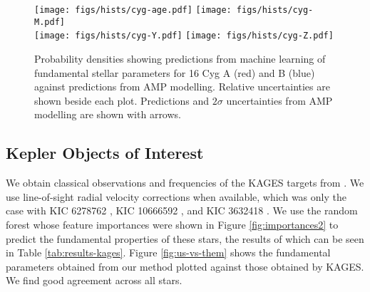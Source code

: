 \documentclass[manuscript]{aastex}
\begin{document}
\begin{figure*}
    \centering
    \texttt{[image: figs/hists/cyg-age.pdf]}\hfill
    \texttt{[image: figs/hists/cyg-M.pdf]}\\
    \texttt{[image: figs/hists/cyg-Y.pdf]}\hfill
    \texttt{[image: figs/hists/cyg-Z.pdf]}
    \caption{Probability densities showing predictions from machine learning of fundamental stellar parameters for 16 Cyg A (red) and B (blue) against predictions from AMP modelling. Relative uncertainties are shown beside each plot. Predictions and $2\sigma$ uncertainties from AMP modelling are shown with arrows.}
    \label{fig:16Cyg-hist}
\end{figure*}


\subsection{Kepler Objects of Interest}
We obtain classical observations and frequencies of the KAGES targets from \citet{2015MNRAS.452.2127S}. We use line-of-sight radial velocity corrections when available, which was only the case with KIC 6278762 \citep{2002AJ....124.1144L}, KIC 10666592 \citep{2013A&A...554A..84M}, and KIC 3632418 \citep{2006AstL...32..759G}. We use the random forest whose feature importances were shown in Figure \ref{fig:importances2} to predict the fundamental properties of these stars, the results of which can be seen in Table \ref{tab:results-kages}. Figure \ref{fig:us-vs-them} shows the fundamental parameters obtained from our method plotted against those obtained by KAGES. We find good agreement across all stars. 
\end{document}
